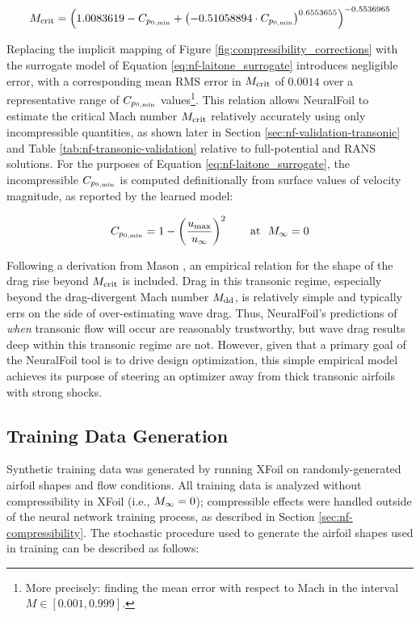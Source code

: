 \begin{equation}
    M_{\rm crit} = \left(
    1.0083619
    - C_{p_{0,\rm min}}
    + \left(-0.51058894 \cdot C_{p_{0,\rm min}} \right)^{0.6553655}
    \right)^{-0.5536965}
    \label{eq:nf-laitone_surrogate}
\end{equation}

Replacing the implicit mapping of Figure \ref{fig:compressibility_corrections} with the surrogate model of Equation \ref{eq:nf-laitone_surrogate} introduces negligible error, with a corresponding mean RMS error in $M_{\rm crit}$ of $0.0014$ over a representative range of $C_{p_{0,\rm min}}$ values\footnote{More precisely: finding the mean error with respect to Mach in the interval $M\in[0.001, 0.999]$.}. This relation allows NeuralFoil to estimate the critical Mach number $M_{\rm crit}$ relatively accurately using only incompressible quantities, as shown later in Section \ref{sec:nf-validation-transonic} and Table \ref{tab:nf-transonic-validation} relative to full-potential and RANS solutions. For the purposes of Equation \ref{eq:nf-laitone_surrogate}, the incompressible $C_{p_{0,\rm min}}$ is computed definitionally from surface values of velocity magnitude, as reported by the learned model:

\begin{equation}
    C_{p_{0,\rm min}} = 1 - \left( \frac{u_{\rm max}}{u_\infty} \right)^2 \qquad \text{at }\ M_\infty = 0
\end{equation}

Following a derivation from Mason \cite{mason_transonic_2006}, an empirical relation for the shape of the drag rise beyond $M_{\rm crit}$ is included. Drag in this transonic regime, especially beyond the drag-divergent Mach number $M_{\rm dd}$, is relatively simple and typically errs on the side of over-estimating wave drag. Thus, NeuralFoil's predictions of \textit{when} transonic flow will occur are reasonably trustworthy, but wave drag results deep within this transonic regime are not. However, given that a primary goal of the NeuralFoil tool is to drive design optimization, this simple empirical model achieves its purpose of steering an optimizer away from thick transonic airfoils with strong shocks.

\subsection{Training Data Generation}
\label{sec:nf-training-data}

Synthetic training data was generated by running XFoil on randomly-generated airfoil shapes and flow conditions. All training data is analyzed without compressibility in XFoil (i.e., $M_\infty=0$); compressible effects were handled outside of the neural network training process, as described in Section \ref{sec:nf-compressibility}. The stochastic procedure used to generate the airfoil shapes used in training can be described as follows:

